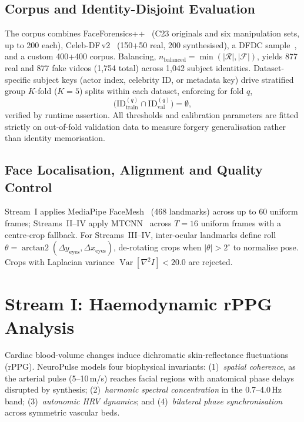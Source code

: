 \documentclass[runningheads]{llncs}
\DeclareMathOperator{\Var}{Var}
\begin{document}
\subsection{Corpus and Identity-Disjoint Evaluation}
The corpus combines FaceForensics++~\cite{rossler2019ff} (C23 originals and six manipulation sets, up to 200 each), Celeb-DF\,v2~\cite{li2020celebdf} (150+50 real, 200 synthesised), a DFDC sample~\cite{dolhansky2020dfdc}, and a custom 400+400 corpus. Balancing, $n_{\mathrm{balanced}}=\min(|\mathcal R|,|\mathcal F|)$, yields 877 real and 877 fake videos (1,754 total) across 1,042 subject identities. Dataset-specific subject keys (actor index, celebrity ID, or metadata key) drive stratified group $K$-fold ($K{=}5$) splits within each dataset, enforcing for fold $q$,
\begin{equation}
\bigl(\mathrm{ID}^{(q)}_{\mathrm{train}}\cap \mathrm{ID}^{(q)}_{\mathrm{val}}\bigr)=\emptyset ,
\label{eq:leak}
\end{equation}
verified by runtime assertion. All thresholds and calibration parameters are fitted strictly on out-of-fold validation data to measure forgery generalisation rather than identity memorisation.

\subsection{Face Localisation, Alignment and Quality Control}
Stream~I applies MediaPipe FaceMesh~\cite{kartynnik2019facemesh} (468 landmarks) across up to 60 uniform frames; Streams~II--IV apply MTCNN~\cite{zhang2016mtcnn} across $T{=}16$ uniform frames with a centre-crop fallback. For Streams~III--IV, inter-ocular landmarks define roll $\theta=\operatorname{arctan2}(\Delta y_{\mathrm{eyes}},\Delta x_{\mathrm{eyes}})$, de-rotating crops when $|\theta|>2^{\circ}$ to normalise pose. Crops with Laplacian variance $\Var[\nabla^{2}I]<20.0$ are rejected.

\section{Stream I: Haemodynamic rPPG Analysis}
Cardiac blood-volume changes induce dichromatic skin-reflectance fluctuations (rPPG). NeuroPulse models four biophysical invariants: (1)~\emph{spatial coherence}, as the arterial pulse (5--10\,m/s) reaches facial regions with anatomical phase delays disrupted by synthesis; (2)~\emph{harmonic spectral concentration} in the 0.7--4.0\,Hz band; (3)~\emph{autonomic HRV dynamics}; and (4)~\emph{bilateral phase synchronisation}~\cite{lachaux1999plv} across symmetric vascular beds.
\end{document}
